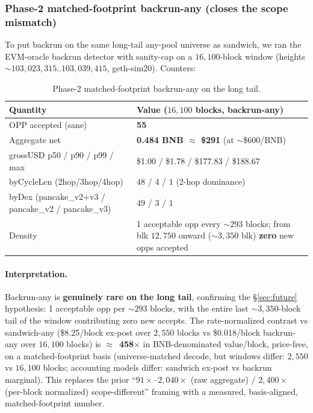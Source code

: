 \documentclass[11pt]{article}
\begin{document}
\subsubsection{Phase-2 matched-footprint backrun-any (closes the scope mismatch)}
\label{sec:contrast-matched}
To put backrun on the same long-tail any-pool universe as sandwich, we ran the
EVM-oracle backrun detector with sanity-cap on a $16{,}100$-block window (heights
$\sim$$103{,}023{,}315..103{,}039{,}415$, geth-sim20). Counters:
\begin{table}[h]\centering
\caption{Phase-2 matched-footprint backrun-any on the long tail.}\label{tab:brany}
\begin{tabular}{ll}
\toprule
Quantity & Value ($16{,}100$ blocks, backrun-any) \\
\midrule
OPP accepted (sane) & \textbf{55} \\
Aggregate net & \textbf{0.484 BNB $\approx$ \$291} (at $\sim$\$600/BNB) \\
grossUSD p50 / p90 / p99 / max & \$1.00 / \$1.78 / \$177.83 / \$188.67 \\
byCycleLen (2hop/3hop/4hop) & $48$ / $4$ / $1$ (2-hop dominance) \\
byDex (pancake\_v2$+$v3 / pancake\_v2 / pancake\_v3) & $49$ / $3$ / $1$ \\
Density & 1 acceptable opp every $\sim$$293$ blocks; from blk $12{,}750$ onward
  ($\sim$$3{,}350$ blk) \textbf{zero} new opps accepted \\
\bottomrule
\end{tabular}
\end{table}

\paragraph{Interpretation.} Backrun-any is \textbf{genuinely rare on the long tail},
confirming the \S\ref{sec:future} hypothesis: 1 acceptable opp per $\sim$$293$ blocks,
with the entire last $\sim$$3{,}350$-block tail of the window contributing zero new
accepts. The rate-normalized contrast vs sandwich-any (\$8.25/block ex-post over
$2{,}550$ blocks vs \$0.018/block backrun-any over $16{,}100$ blocks) is
$\approx$~\textbf{458$\times$} in BNB-denominated value/block, price-free, on a
matched-footprint basis (universe-matched decode, but windows differ: $2{,}550$ vs
$16{,}100$ blocks; accounting models differ: sandwich ex-post vs backrun marginal). This
replaces the prior ``$91\times$--$2{,}040\times$ (raw aggregate) $/$ $2{,}400\times$
(per-block normalized) scope-different'' framing with a measured, basis-aligned,
matched-footprint number.
\end{document}

